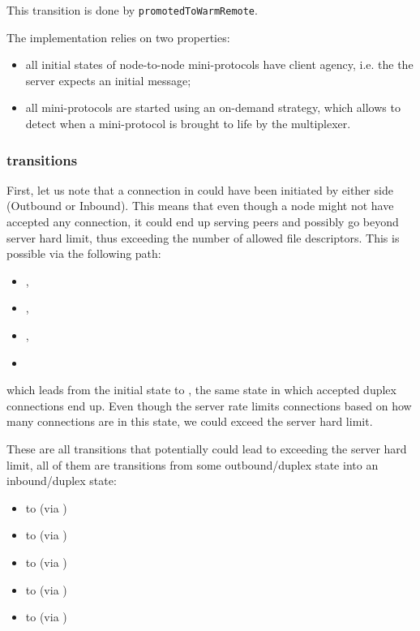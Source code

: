 \begin{detail}
  This transition is done by \texttt{promotedToWarmRemote}.

  The implementation relies on two properties:
  \begin{itemize}
    \item all initial states of node-to-node mini-protocols have client agency, i.e. the
      the server expects an initial message;
    \item all mini-protocols are started using an on-demand strategy, which allows
      to detect when a mini-protocol is brought to life by the multiplexer.
  \end{itemize}
\end{detail}


\subsubsection{\Prune{} transitions}
First, let us note that a connection in \InboundStateDup{} could have been
initiated by either side (Outbound or Inbound). This means that even though a node might not have
accepted any connection, it could end up serving peers and possibly go beyond
server hard limit, thus exceeding the number of allowed file descriptors. This is
possible via the following path:

\begin{itemize}
  \item[] \Connected{},
  \item[] \NegotiatedDupOut{},
  \item[] \PromotedToWarmDupRem{},
  \item[] \DemotedToColdDupLoc{}
\end{itemize}

which leads from the initial state \InitialState{} to \InboundStateDup{}, the
same state in which accepted duplex connections end up. Even though the server
rate limits connections based on how many connections are in this state, we
could exceed the server hard limit.

These are all transitions that potentially could lead to exceeding the server hard limit,
all of them are transitions from some outbound/duplex state into an inbound/duplex state:
\begin{itemize}
  \item \DuplexState{} to \InboundStateDup{} (via \DemotedToColdDupLoc{})
  \item \OutboundStateDupTau{} to \InboundStateDup{} (via \DemotedToColdDupLoc{})
  \item \OutboundIdleStateDup{} to \InboundStateDup{} (via \AwakeDupRem{})
  \item \OutboundStateDupTau{} to \DuplexState{} (via \PromotedToWarmDupRem{})
  \item \OutboundStateDup{} to \DuplexState{} (via \PromotedToWarmDupRem{})
\end{itemize}

